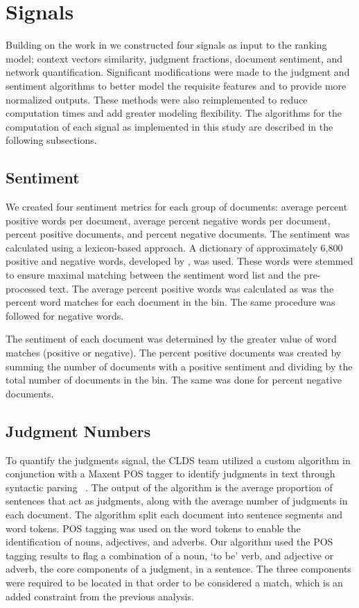 \documentclass[11pt, a4paper]{article}
\begin{document}
\section{Signals}\label{signals}

Building on the work in  we constructed four signals as input to the ranking model; context vectors similarity, judgment fractions, document sentiment, and network quantification. Significant modifications were made to the judgment and sentiment algorithms to better model the requisite features and to provide more normalized outputs. These methods were also reimplemented to reduce computation times and add greater modeling flexibility. The algorithms for the computation of each signal as implemented in this study are described in the following subsections.

\subsection{Sentiment}

We created four sentiment metrics for each group of documents: average percent positive words per document, average percent negative words per document, percent positive documents, and percent negative documents. The sentiment was calculated using a lexicon-based approach. A dictionary of approximately 6,800 positive and negative words, developed by , was used. These words were stemmed to ensure maximal matching between the sentiment word list and the pre-processed text. The average percent positive words was calculated as was the percent word matches for each document in the bin. The same procedure was followed for negative words. 

The sentiment of each document was determined by the greater value of word matches (positive or negative). The percent positive documents was created by summing the number of documents with a positive sentiment and dividing by the total number of documents in the bin. The same was done for percent negative documents.

\subsection{Judgment Numbers}\label{subsec:judgment}

To quantify the judgments signal, the CLDS team utilized a custom algorithm in conjunction with a Maxent POS tagger to identify judgments in text through syntactic parsing ~\cite{Hornik2011}. The output of the algorithm is the average proportion of sentences that act as judgments, along with the average number of judgments in each document. The algorithm split each document into sentence segments and word tokens. POS tagging was used on the word tokens to enable the identification of nouns, adjectives, and adverbs. Our algorithm used the POS tagging results to flag a combination of a noun, `to be' verb, and adjective or adverb, the core components of a judgment, in a sentence. The three components were required to be located in that order to be considered a match, which is an added constraint from the previous analysis.  
\end{document}
